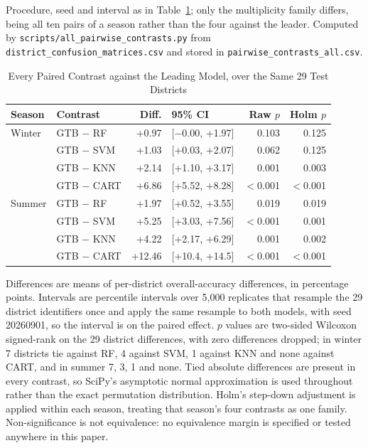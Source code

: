 \documentclass[conference]{IEEEtran}
\begin{document}
\begin{table}[!htbp]
\begin{center}
\vspace{2pt}
\parbox{\columnwidth}{\footnotesize Procedure, seed and interval as in Table~\ref{tab_paired}; only the multiplicity family differs, being all ten pairs of a season rather than the four against the leader. Computed by \texttt{scripts/all\_pairwise\_contrasts.py} from \texttt{district\_confusion\_matrices.csv} and stored in \texttt{pairwise\_contrasts\_all.csv}.}
\end{center}
\end{table}

\begin{table}[!htbp]
\caption{Every Paired Contrast against the Leading Model, over the Same 29 Test Districts}
\label{tab_paired}
\begin{center}
\setlength{\tabcolsep}{2pt}
\footnotesize
\begin{tabular}{@{}llrlrr@{}}
\toprule
\textbf{Season} & \textbf{Contrast} & \textbf{Diff.} & \textbf{95\% CI} & \textbf{Raw $p$} & \textbf{Holm $p$} \\
\midrule
Winter & GTB $-$ RF   & +0.97 & [$-$0.00, +1.97] & 0.103 & 0.125 \\
       & GTB $-$ SVM  & +1.03 & [+0.03, +2.07]   & 0.062 & 0.125 \\
       & GTB $-$ KNN  & +2.14 & [+1.10, +3.17]   & 0.001 & 0.003 \\
       & GTB $-$ CART & +6.86 & [+5.52, +8.28]   & $<$0.001 & $<$0.001 \\
\midrule
Summer & GTB $-$ RF   & +1.97 & [+0.52, +3.55]   & 0.019 & 0.019 \\
       & GTB $-$ SVM  & +5.25 & [+3.03, +7.56]   & $<$0.001 & 0.001 \\
       & GTB $-$ KNN  & +4.22 & [+2.17, +6.29]   & 0.001 & 0.002 \\
       & GTB $-$ CART & +12.46 & [+10.4, +14.5] & $<$0.001 & $<$0.001 \\
\bottomrule
\end{tabular}

\vspace{2pt}
\parbox{\columnwidth}{\footnotesize Differences are means of per-district overall-accuracy differences, in percentage points. Intervals are percentile intervals over 5,000 replicates that resample the 29 district identifiers once and apply the same resample to both models, with seed 20260901, so the interval is on the paired effect. $p$ values are two-sided Wilcoxon signed-rank on the 29 district differences, with zero differences dropped; in winter 7 districts tie against RF, 4 against SVM, 1 against KNN and none against CART, and in summer 7, 3, 1 and none. Tied absolute differences are present in every contrast, so SciPy's asymptotic normal approximation is used throughout rather than the exact permutation distribution. Holm's step-down adjustment is applied within each season, treating that season's four contrasts as one family. Non-significance is not equivalence: no equivalence margin is specified or tested anywhere in this paper.}
\end{center}
\end{table}
\end{document}
